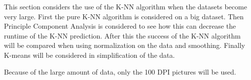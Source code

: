 This section considers the use of the K-NN algorithm when the datasets become very large.
First the pure K-NN algorithm is considered on a big dataset.
Then Principle Component Analysis is considered to see how this can decrease the runtime of the K-NN prediction.
After this the success of the K-NN algorithm will be compared when using normalization on the data and smoothing.
Finally K-means will be considered in simplification of the data.

Because of the large amount of data, only the 100 DPI pictures will be used.